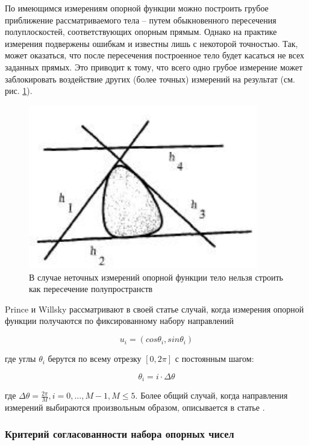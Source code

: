 \documentclass[a4paper, 12pt, titlepage]{article}
\theoremstyle{definition}
\theoremstyle{plain}
\theoremstyle{plain}
\begin{document}
По имеющимся измерениям опорной функции можно построить грубое приближение
рассматриваемого тела -- путем обыкновенного пересечения полуплоскостей,
соответствующих опорным прямым. Однако на практике измерения подвержены
ошибкам и известны лишь с некоторой точностью. Так, может оказаться, что
после пересечения построенное тело будет касаться не всех заданных прямых.
Это приводит к тому, что всего одно грубое измерение может заблокировать
воздействие других (более точных) измерений на результат (см. рис.
\ref{inconsistent}).

\begin{figure}[ht]
    \includegraphics[width=10cm]{images/inconsistent-support-planes.jpg}
    \caption{В случае неточных измерений опорной функции тело нельзя строить
    как пересечение полупространств}
    \label{inconsistent}
\end{figure}

Prince и Willsky рассматривают в своей статье случай, когда измерения опорной
функции получаются по фиксированному набору направлений

\begin{equation}
 u_{i} = (cos \theta_{i}, sin \theta_{i})
\end{equation}

где углы $\theta_{i}$ берутся по всему отрезку $[0, 2 \pi]$ с постоянным шагом:

\begin{equation}
 \theta_{i} = i \cdot \Delta \theta
\end{equation}

где $\Delta \theta = \frac{2 \pi}{M}, i = 0, \ldots, M - 1, M \leq 5$. Более
общий случай, когда направления измерений выбираются произвольным образом,
описывается в статье
\cite[Lele - Kulkarni - Willsky (1992)]{journals/josaa/LeleKW92}.

\subsubsection{Критерий согласованности набора опорных чисел}
\label{sec:history/PrinceW90/criterion}
\end{document}
